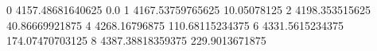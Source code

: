 0 4157.48681640625 0.0
1 4167.53759765625 10.05078125
2 4198.353515625 40.86669921875
4 4268.16796875 110.68115234375
6 4331.5615234375 174.07470703125
8 4387.38818359375 229.9013671875
